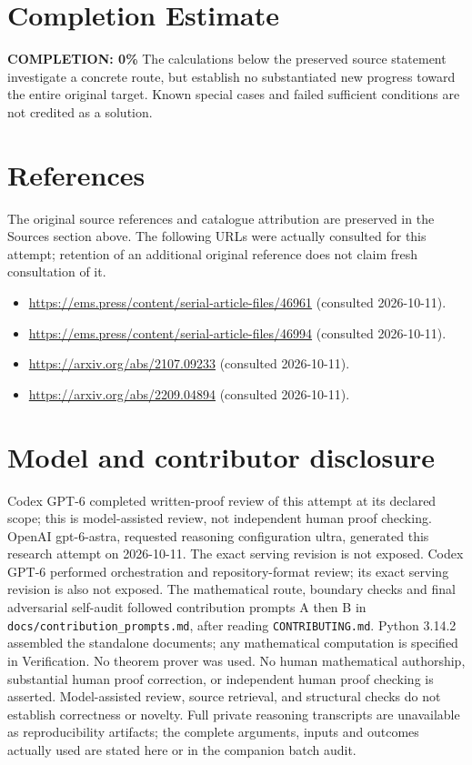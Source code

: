 \documentclass[11pt]{article}
\begin{document}
\section{Completion Estimate}
\noindent\textbf{COMPLETION: 0\%}
The calculations below the preserved source statement investigate a concrete route,
but establish no substantiated new progress toward the entire original target.
Known special cases and failed sufficient conditions are not credited as a solution.
\section{References}
The original source references and catalogue attribution are preserved in the
Sources section above. The following URLs were actually consulted for this attempt;
retention of an additional original reference does not claim fresh consultation of it.
\begin{itemize}
\item \url{https://ems.press/content/serial-article-files/46961} (consulted 2026-10-11). 
\item \url{https://ems.press/content/serial-article-files/46994} (consulted 2026-10-11). 
\item \url{https://arxiv.org/abs/2107.09233} (consulted 2026-10-11). 
\item \url{https://arxiv.org/abs/2209.04894} (consulted 2026-10-11). 
\end{itemize}
\section{Model and contributor disclosure}
Codex GPT-6 completed written-proof review of this attempt at its declared scope; this is model-assisted review, not independent human proof checking.
OpenAI gpt-6-astra, requested reasoning configuration ultra, generated this research
attempt on 2026-10-11. The exact serving revision is not exposed. Codex GPT-6
performed orchestration and repository-format review; its exact serving revision
is also not exposed. The mathematical route, boundary checks and final adversarial
self-audit followed contribution prompts A then B in
\texttt{docs/contribution\_prompts.md}, after reading \texttt{CONTRIBUTING.md}.
Python 3.14.2 assembled the standalone documents; any mathematical computation is
specified in Verification. No theorem prover was used. No human mathematical
authorship, substantial human proof correction, or independent human proof checking
is asserted. Model-assisted review, source retrieval, and structural checks do not
establish correctness or novelty. Full private reasoning transcripts are unavailable
as reproducibility artifacts; the complete arguments, inputs and outcomes actually
used are stated here or in the companion batch audit.
\end{document}

